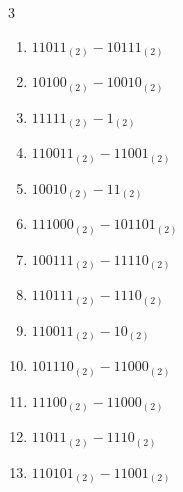 \begin{multicols}{3}
\begin{enumerate}

  \item $11011_{(2)} - 10111_{(2)}$


\columnbreak %

  \item $10100_{(2)} - 10010_{(2)}$


  \item $11111_{(2)} - 1_{(2)}$


  \item $110011_{(2)} - 11001_{(2)}$


  \item $10010_{(2)} - 11_{(2)}$


  \item $111000_{(2)} - 101101_{(2)}$


  \item $100111_{(2)} - 11110_{(2)}$


  \item $110111_{(2)} - 1110_{(2)}$


  \item $110011_{(2)} - 10_{(2)}$


  \item $101110_{(2)} - 11000_{(2)}$


  \item $11100_{(2)} - 11000_{(2)}$


\columnbreak %

  \item $11011_{(2)} - 1110_{(2)}$


  \item $110101_{(2)} - 11001_{(2)}$



\end{enumerate}
\end{multicols}
